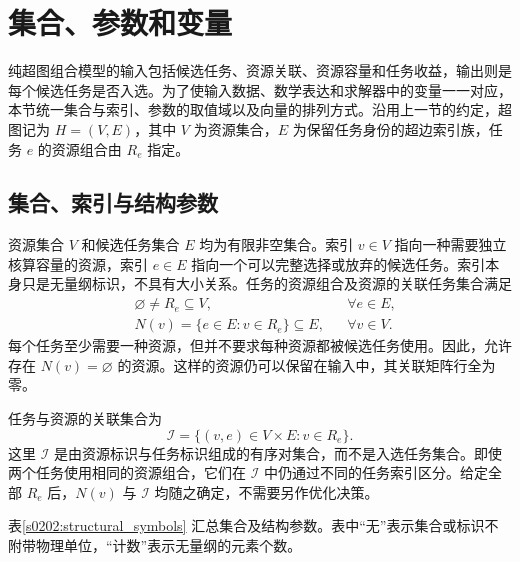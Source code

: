 \section{集合、参数和变量}
\label{sec:02_02}

纯超图组合模型的输入包括候选任务、资源关联、资源容量和任务收益，输出则是每个候选任务是否入选。为了使输入数据、数学表达和求解器中的变量一一对应，本节统一集合与索引、参数的取值域以及向量的排列方式。沿用上一节的约定，超图记为 $H=(V,E)$，其中 $V$ 为资源集合，$E$ 为保留任务身份的超边索引族，任务 $e$ 的资源组合由 $R_e$ 指定。

\subsection{集合、索引与结构参数}

资源集合 $V$ 和候选任务集合 $E$ 均为有限非空集合。索引 $v\in V$ 指向一种需要独立核算容量的资源，索引 $e\in E$ 指向一个可以完整选择或放弃的候选任务。索引本身只是无量纲标识，不具有大小关系。任务的资源组合及资源的关联任务集合满足
\begin{align}
 &\varnothing\ne R_e\subseteq V,
 &&\forall e\in E,
 \label{s0202:resource_sets}\\
 &N(v)=\{e\in E:v\in R_e\}\subseteq E,
 &&\forall v\in V.
 \label{s0202:neighbor_sets}
\end{align}
每个任务至少需要一种资源，但并不要求每种资源都被候选任务使用。因此，允许存在 $N(v)=\varnothing$ 的资源。这样的资源仍可以保留在输入中，其关联矩阵行全为零。

任务与资源的关联集合为
\begin{equation}
 \mathcal I=\{(v,e)\in V\times E:v\in R_e\}.
 \label{s0202:incidence_pairs}
\end{equation}
这里 $\mathcal I$ 是由资源标识与任务标识组成的有序对集合，而不是入选任务集合。即使两个任务使用相同的资源组合，它们在 $\mathcal I$ 中仍通过不同的任务索引区分。给定全部 $R_e$ 后，$N(v)$ 与 $\mathcal I$ 均随之确定，不需要另作优化决策。

表\ref{s0202:structural_symbols} 汇总集合及结构参数。表中“无”表示集合或标识不附带物理单位，“计数”表示无量纲的元素个数。

